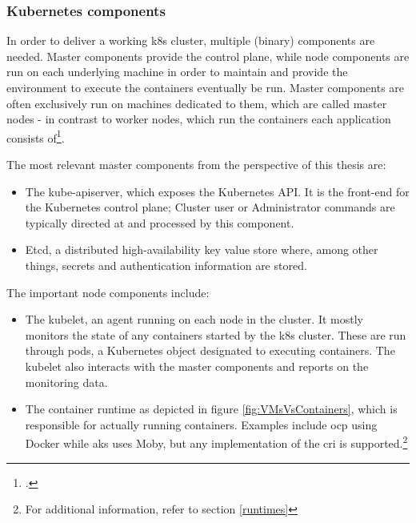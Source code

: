 \subsubsection{Kubernetes components} \label{k8sComponents}

In order to deliver a working \gls{k8s} cluster, multiple (binary) components are needed.
Master components provide the control plane, while node components are run on each underlying machine in order to maintain and provide the environment to execute the containers eventually be run.
Master components are often exclusively run on machines dedicated to them, which are called master nodes - in contrast to worker nodes, which run the containers each application consists of\footcite[][, section 'Master Components']{k8sComponents}.

The most relevant master components from the perspective of this thesis are:
\begin{itemize}

\item The kube-apiserver, which exposes the Kubernetes API. It is the front-end for the Kubernetes control plane; Cluster user or Administrator commands are typically directed at and processed by this component.

\item Etcd, a distributed high-availability key value store where, among other things, secrets and authentication information are stored.

\end{itemize}

The important node components include:
\begin{itemize}

\item The kubelet, an agent running on each node in the cluster. It mostly monitors the state of any containers started by the \gls{k8s} cluster. These are run through pods, a Kubernetes object designated to executing containers. The kubelet also interacts with the master components and reports on the monitoring data.

\item The container runtime as depicted in figure \ref{fig:VMsVsContainers}, which is responsible for actually running containers. Examples include \gls{ocp} using Docker while \gls{aks} uses Moby, but any implementation of the \gls{cri} is supported.\footnote{For additional information, refer to section \ref{runtimes}} 

\end{itemize}

